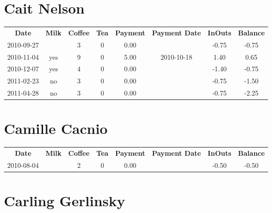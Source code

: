 \section{Cait Nelson}

\begin{center}
\begin{tabular}{cccccccc}
\textbf{Date} & \textbf{Milk} & \textbf{Coffee} & \textbf{Tea} & \textbf{Payment} & \textbf{Payment Date} & \textbf{InOuts} & \textbf{Balance} \\
2010-09-27 &  & 3 & 0 & 0.00 &  & -0.75 & -0.75\\ 
2010-11-04 & yes & 9 & 0 & 5.00 & 2010-10-18 &  1.40 &  0.65\\ 
2010-12-07 & yes & 4 & 0 & 0.00 &  & -1.40 & -0.75\\ 
2011-02-23 & no & 3 & 0 & 0.00 &  & -0.75 & -1.50\\ 
2011-04-28 & no & 3 & 0 & 0.00 &  & -0.75 & -2.25
\end{tabular}
\end{center}

\section{Camille Cacnio}

\begin{center}
\begin{tabular}{cccccccc}
\textbf{Date} & \textbf{Milk} & \textbf{Coffee} & \textbf{Tea} & \textbf{Payment} & \textbf{Payment Date} & \textbf{InOuts} & \textbf{Balance} \\
2010-08-04 &  & 2 & 0 & 0.00 &  & -0.50 & -0.50
\end{tabular}
\end{center}

\section{Carling Gerlinsky}

